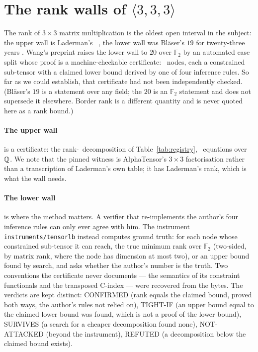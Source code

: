 \documentclass[11pt]{article}
\newcommand{\F}{\mathbb{F}}
\newcommand{\mm}[3]{\langle #1,#2,#3\rangle}
\begin{document}
\section{The rank walls of $\mm333$}\label{sec:walls}

The rank of $3\times3$ matrix multiplication is the oldest open interval in the subject: the upper wall is
Laderman's \LadermanRank\ \cite{La76}, the lower wall was Bl\"aser's $19$ for twenty-three years
\cite{Bl03}. Wang's preprint \cite{Wa26} raises the lower wall to $20$ over $\F_2$ by an automated
case split whose proof is a machine-checkable certificate: \LBNodes\ nodes, each a constrained sub-tensor
with a claimed lower bound derived by one of four inference rules. So far as we could establish, that
certificate had not been independently checked. (Bl\"aser's $19$ is a statement over any field; the $20$ is
an $\F_2$ statement and does not supersede it elsewhere. Border rank is a different quantity and is never
quoted here as a rank bound.)

\paragraph{The upper wall} is a certificate: the rank-\LadermanRank\ decomposition of
Table~\ref{tab:registry}, \LadermanEquations\ equations over $\mathbb{Q}$. We note that the pinned witness is
AlphaTensor's $3\times3$ factorisation rather than a transcription of Laderman's own table; it has
Laderman's rank, which is what the wall needs.

\paragraph{The lower wall} is where the method matters. A verifier that re-implements the author's four
inference rules can only ever agree with him. The instrument \texttt{instruments/tensorlb} instead computes
ground truth: for each node whose constrained sub-tensor it can reach, the true minimum rank over $\F_2$
(two-sided, by matrix rank, where the node has dimension at most two), or an upper bound found by search,
and asks whether the author's number is the truth. Two conventions the certificate never documents --- the
semantics of its constraint functionals and the transposed C-index --- were recovered from the bytes. The
verdicts are kept distinct: CONFIRMED (rank equals the claimed bound, proved both ways, the author's rules
not relied on), TIGHT-IF (an upper bound equal to the claimed lower bound was found, which is not a proof of
the lower bound), SURVIVES (a search for a cheaper decomposition found none), NOT-ATTACKED (beyond the
instrument), REFUTED (a decomposition below the claimed bound exists).
\end{document}
